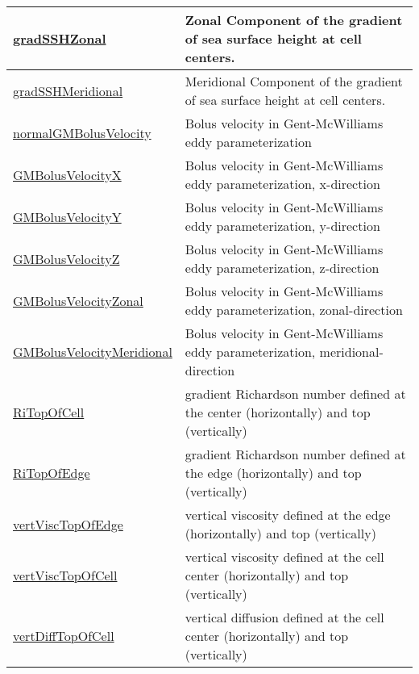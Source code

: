 {\begin{center}
\begin{longtable}{| p{2.0in} | p{4.0in} |}
    \hline
    \hyperref[subsec:var_sec_diagnostics_gradSSHZonal]{gradSSHZonal} & Zonal Component of the gradient of sea surface height at cell centers. \\
    \hline
    \hyperref[subsec:var_sec_diagnostics_gradSSHMeridional]{gradSSHMeridional} & Meridional Component of the gradient of sea surface height at cell centers. \\
    \hline
    \hyperref[subsec:var_sec_diagnostics_normalGMBolusVelocity]{normalGMBolusVelocity} & Bolus velocity in Gent-McWilliams eddy parameterization \\
    \hline
    \hyperref[subsec:var_sec_diagnostics_GMBolusVelocityX]{GMBolusVelocityX} & Bolus velocity in Gent-McWilliams eddy parameterization, x-direction \\
    \hline
    \hyperref[subsec:var_sec_diagnostics_GMBolusVelocityY]{GMBolusVelocityY} & Bolus velocity in Gent-McWilliams eddy parameterization, y-direction \\
    \hline
    \hyperref[subsec:var_sec_diagnostics_GMBolusVelocityZ]{GMBolusVelocityZ} & Bolus velocity in Gent-McWilliams eddy parameterization, z-direction \\
    \hline
    \hyperref[subsec:var_sec_diagnostics_GMBolusVelocityZonal]{GMBolusVelocityZonal} & Bolus velocity in Gent-McWilliams eddy parameterization, zonal-direction \\
    \hline
    \hyperref[subsec:var_sec_diagnostics_GMBolusVelocityMeridional]{GMBolusVelocityMeridional} & Bolus velocity in Gent-McWilliams eddy parameterization, meridional-direction \\
    \hline
    \hyperref[subsec:var_sec_diagnostics_RiTopOfCell]{RiTopOfCell} & gradient Richardson number defined at the center (horizontally) and top (vertically) \\
    \hline
    \hyperref[subsec:var_sec_diagnostics_RiTopOfEdge]{RiTopOfEdge} & gradient Richardson number defined at the edge (horizontally) and top (vertically) \\
    \hline
    \hyperref[subsec:var_sec_diagnostics_vertViscTopOfEdge]{vertViscTopOfEdge} & vertical viscosity defined at the edge (horizontally) and top (vertically) \\
    \hline
    \hyperref[subsec:var_sec_diagnostics_vertViscTopOfCell]{vertViscTopOfCell} & vertical viscosity defined at the cell center (horizontally) and top (vertically) \\
    \hline
    \hyperref[subsec:var_sec_diagnostics_vertDiffTopOfCell]{vertDiffTopOfCell} & vertical diffusion defined at the cell center (horizontally) and top (vertically) \\

\end{longtable}
\end{center}}
